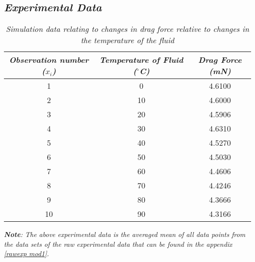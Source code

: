 

\subsection{\textit{Experimental Data}}

	\begin{table}[H]
		\centering
		\begin{tabular}{|c|c|c|}
			\hline
			\hline
			\textit{Observation number ($x_i$)} & \textit{Temperature of Fluid ($^\circ$C)} & \textit{Drag Force (mN)} \\
			\hline
			\hline
			1 & 0 & 4.6100 \\
			\hline
			2 & 10 & 4.6000 \\
			\hline
			3 & 20 & 4.5906 \\
			\hline
			4 & 30 & 4.6310 \\
			\hline
			5 & 40 & 4.5270 \\
			\hline
			6 & 50 & 4.5030 \\
			\hline
			7 & 60 & 4.4606 \\
			\hline
			8 & 70 & 4.4246 \\
			\hline
			9 & 80 & 4.3666 \\
			\hline
			10 & 90 & 4.3166 \\
			\hline
			\hline
		\end{tabular}
		\caption{\textit{Simulation data relating to changes in drag force relative to changes in the temperature of the fluid}}
		\label{expdat}
	\end{table}

	\textit{\textbf{Note}: The above experimental data is the averaged mean of all data points from the data sets of the raw experimental data that can be found in the appendix \ref{rawexp mod1}.}

